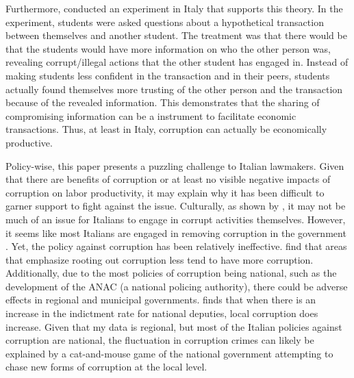 \documentclass[12pt]{article} %
\begin{document}
Furthermore, \citet{zhang_changing_2015} conducted an experiment in Italy that supports this theory. In the experiment, students were asked questions about a hypothetical transaction between themselves and another student. The treatment was that there would be that the students would have more information on who the other person was, revealing corrupt/illegal actions that the other student has engaged in. Instead of making students less confident in the transaction and in their peers, students actually found themselves more trusting of the other person and the transaction because of the revealed information. This demonstrates that the sharing of compromising information can be a instrument to facilitate economic transactions. Thus, at least in Italy, corruption can actually be economically productive. 

 Policy-wise, this paper presents a puzzling challenge to Italian lawmakers. Given that there are benefits of corruption or at least no visible negative impacts of corruption on labor productivity, it may explain why it has been difficult to garner support to fight against the issue. Culturally, as shown by \citet{zhang_changing_2015}, it may not be much of an issue for Italians to engage in corrupt activities themselves. However, it seems like most Italians are engaged in removing corruption in the government \citep{european_commission_corruption_2014}. Yet, the policy against corruption has been relatively ineffective. \citet{corrado_public_2018} find that areas that emphasize rooting out corruption less tend to have more corruption. Additionally, due to the most policies of corruption being national, such as the development of the ANAC (a national policing authority), there could be adverse effects in regional and municipal governments. \citet{woodhouse_accountability_2022} finds that when there is an increase in the indictment rate for national deputies, local corruption does increase. Given that my data is regional, but most of the Italian policies against corruption are national, the fluctuation in corruption crimes can likely be explained by a cat-and-mouse game of the national government attempting to chase new forms of corruption at the local level.
\end{document}
